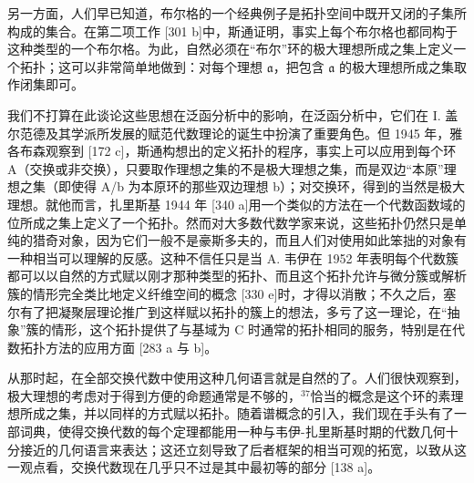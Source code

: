 另一方面，人们早已知道，布尔格的一个经典例子是拓扑空间中既开又闭的子集所构成的集合。在第二项工作 {[}301 b{]}中，斯通证明，事实上每个布尔格也都同构于这种类型的一个布尔格。为此，自然必须在“布尔”环的极大理想所成之集上定义一个拓扑；这可以非常简单地做到：对每个理想 \(\mathfrak{a}\)，把包含 \(\mathfrak{a}\) 的极大理想所成之集取作闭集即可。

我们不打算在此谈论这些思想在泛函分析中的影响，在泛函分析中，它们在 I. 盖尔范德及其学派所发展的赋范代数理论的诞生中扮演了重要角色。但 1945 年，雅各布森观察到 {[}172 c{]}，斯通构想出的定义拓扑的程序，事实上可以应用到每个环 A（交换或非交换），只要取作理想之集的不是极大理想之集，而是双边“本原”理想之集（即使得 A/b 为本原环的那些双边理想 b）；对交换环，得到的当然是极大理想。就他而言，扎里斯基 1944 年 {[}340 a{]}用一个类似的方法在一个代数函数域的位所成之集上定义了一个拓扑。然而对大多数代数学家来说，这些拓扑仍然只是单纯的猎奇对象，因为它们一般不是豪斯多夫的，而且人们对使用如此笨拙的对象有一种相当可以理解的反感。这种不信任只是当 A. 韦伊在 1952 年表明每个代数簇都可以以自然的方式赋以刚才那种类型的拓扑、而且这个拓扑允许与微分簇或解析簇的情形完全类比地定义纤维空间的概念 {[}330 e{]}时，才得以消散；不久之后，塞尔有了把凝聚层理论推广到这样赋以拓扑的簇上的想法，多亏了这一理论，在“抽象”簇的情形，这个拓扑提供了与基域为 C 时通常的拓扑相同的服务，特别是在代数拓扑方法的应用方面 {[}283 a 与 b{]}。

从那时起，在全部交换代数中使用这种几何语言就是自然的了。人们很快观察到，极大理想的考虑对于得到方便的命题通常是不够的，\(^{37}\)恰当的概念是这个环的素理想所成之集，并以同样的方式赋以拓扑。随着谱概念的引入，我们现在手头有了一部词典，使得交换代数的每个定理都能用一种与韦伊-扎里斯基时期的代数几何十分接近的几何语言来表达；这还立刻导致了后者框架的相当可观的拓宽，以致从这一观点看，交换代数现在几乎只不过是其中最初等的部分 {[}138 a{]}。

